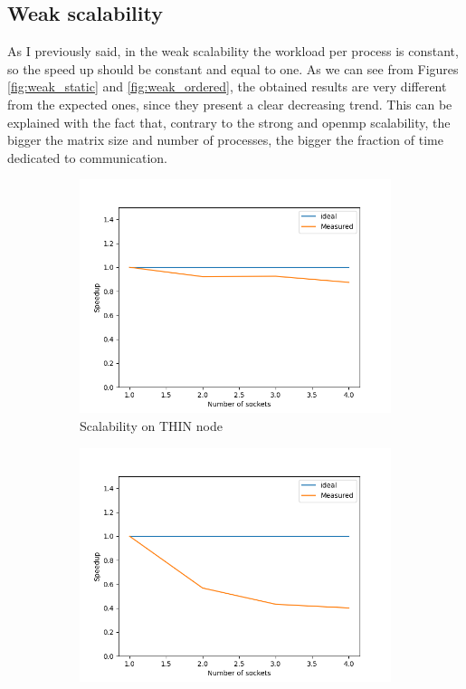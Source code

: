 \documentclass[12pt]{article}
\begin{document}
    
    \subsection{Weak scalability}
	As I previously said, in the weak scalability the workload per process is constant, so the speed up should be constant and equal to one. As we can see from Figures \ref{fig:weak_static} and \ref{fig:weak_ordered}, the obtained results  are very different from the expected ones, since they present a clear decreasing trend. This can be explained with the fact that, contrary to the strong and openmp scalability, the bigger the matrix size and number of processes, the bigger the fraction of time dedicated to communication.
	
    \begin{figure}[h]
    \centering
    \begin{subfigure}[b]{0.4\textwidth}
        \includegraphics[width = \textwidth]{figs1/Weak_scal_THIN.png}
        \caption{Scalability on THIN node}
        \label{fig:weak_thin}
    \end{subfigure}
		\begin{subfigure}[b]{0.4\textwidth}
		\includegraphics[width = \textwidth]{figs1/Weak_scal_EPYC.png}

\end{subfigure}
\end{figure}
\end{document}
